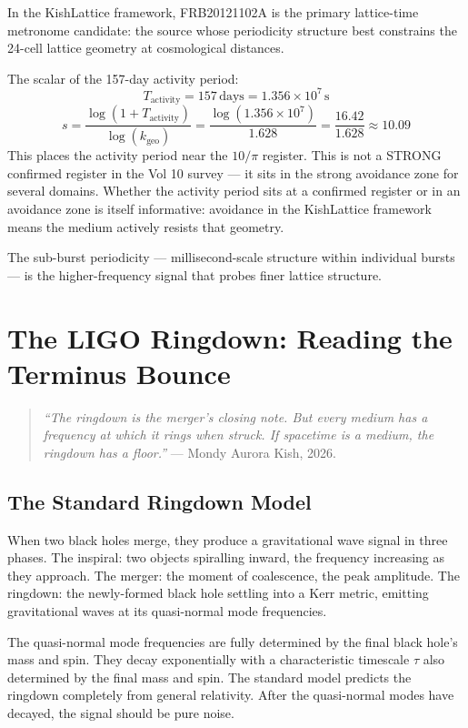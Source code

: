 \documentclass[11pt, letterpaper, openany]{book}
\begin{document}
In the KishLattice framework, FRB20121102A is the primary lattice-time
metronome candidate: the source whose periodicity structure best constrains
the 24-cell lattice geometry at cosmological distances.

The scalar of the 157-day activity period:
\[
T_\text{activity} = 157\,\text{days} = 1.356 \times 10^7\,\text{s}
\]
\[
s = \frac{\log(1 + T_\text{activity})}{\log(k_\text{geo})}
= \frac{\log(1.356 \times 10^7)}{1.628} = \frac{16.42}{1.628} \approx 10.09
\]
This places the activity period near the $10/\pi$ register. This is not a
STRONG confirmed register in the Vol 10 survey --- it sits in the strong
avoidance zone for several domains. Whether the activity period sits at
a confirmed register or in an avoidance zone is itself informative: avoidance
in the KishLattice framework means the medium actively resists that geometry.

The sub-burst periodicity --- millisecond-scale structure within individual
bursts --- is the higher-frequency signal that probes finer lattice structure.

\clearpage
\chapter{The LIGO Ringdown: Reading the Terminus Bounce}

\begin{quote}
\textit{``The ringdown is the merger's closing note. But every medium
has a frequency at which it rings when struck. If spacetime is a medium,
the ringdown has a floor.''} --- Mondy Aurora Kish, 2026.
\end{quote}

\section{The Standard Ringdown Model}

When two black holes merge, they produce a gravitational wave signal in
three phases. The inspiral: two objects spiralling inward, the frequency
increasing as they approach. The merger: the moment of coalescence, the
peak amplitude. The ringdown: the newly-formed black hole settling into
a Kerr metric, emitting gravitational waves at its quasi-normal mode
frequencies.

The quasi-normal mode frequencies are fully determined by the final black
hole's mass and spin. They decay exponentially with a characteristic
timescale $\tau$ also determined by the final mass and spin. The standard
model predicts the ringdown completely from general relativity.
After the quasi-normal modes have decayed, the signal should be pure noise.
\end{document}
